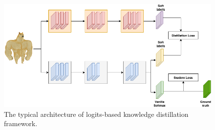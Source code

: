 \begin{figure}[h!]
   \begin{center}
      \includegraphics[width=0.8\linewidth]{assets/logits_based.png}
   \end{center}
      \caption{The typical architecture of logits-based knowledge distillation framework.}
   \label{fig:logits_base}
\end{figure}
